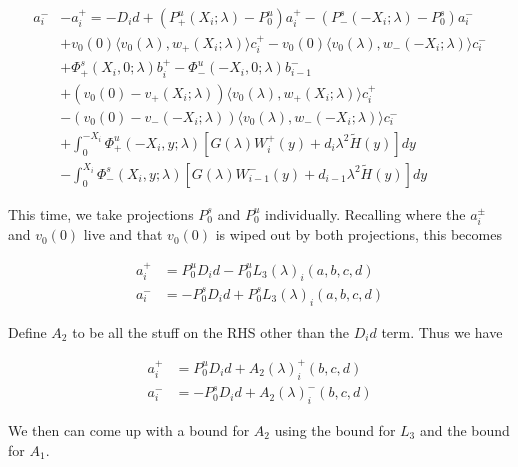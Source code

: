 \documentclass[12pt]{article}
\begin{document}
\begin{align*}
a_i^- &- a_i^+ = -D_i d + (P^u_+(X_i; \lambda) - P_0^u)a_i^+ - (P^s_-(-X_i; \lambda) - P_0^s)a_i^- \\
&+ v_0(0) \langle v_0(\lambda), w_+(X_i; \lambda) \rangle c_i^+ 
- v_0(0) \langle v_0(\lambda), w_-(-X_i; \lambda) \rangle c_i^- \\
&+ \Phi^s_+(X_i, 0; \lambda)b_i^+ - \Phi^u_-(-X_i, 0; \lambda)b_{i-1}^- \\
&+ (v_0(0) - v_+(X_i; \lambda)) \langle v_0(\lambda), w_+(X_i; \lambda) \rangle c_i^+ \\
&- (v_0(0) - v_-(-X_i; \lambda)) \langle v_0(\lambda), w_-(-X_i; \lambda) \rangle c_i^- \\
&+ \int_0^{-X_i} \Phi^u_+(-X_i, y; \lambda) [ G(\lambda)W_i^+(y) + d_i \lambda^2 \tilde{H}(y) ] dy \\
&- \int_0^{X_i} \Phi^s_-(X_i, y; \lambda) [ G(\lambda)W_{i-1}^-(y) + d_{i-1} \lambda^2 \tilde{H}(y) ] dy  
\end{align*}

This time, we take projections $P^s_0$ and $P^u_0$ individually. Recalling where the $a_i^\pm$ and $v_0(0)$ live and that $v_0(0)$ is wiped out by both projections, this becomes 

\begin{align*}
a_i^+ &= P^u_0 D_i d - P^u_0 L_3(\lambda)_i(a, b, c, d) \\
a_i^- &= -P^s_0 D_i d + P^s_0 L_3(\lambda)_i(a, b, c, d)
\end{align*}

Define $A_2$ to be all the stuff on the RHS other than the $D_i d$ term. Thus we have 

\begin{align*}
a_i^+ &= P^u_0 D_i d + A_2(\lambda)_i^+(b, c, d) \\
a_i^- &= -P^s_0 D_i d + A_2(\lambda)_i^-(b, c, d)
\end{align*}

We then can come up with a bound for $A_2$ using the bound for $L_3$ and the bound for $A_1$.
\end{document}
